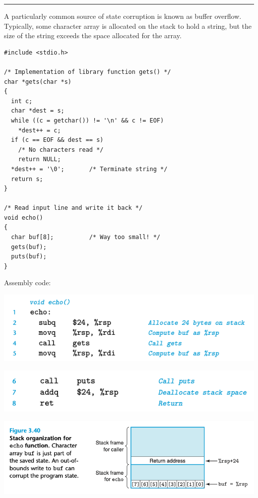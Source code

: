 \documentclass[11pt]{article}
\begin{document}
\noindent\rule{\textwidth}{0.5pt}
A particularly common source of state corruption is known as buffer overflow. Typically, some character array is allocated on the stack to hold a string, but the size of the string exceeds the space allocated for the array.\\

\begin{verbatim}
#include <stdio.h>

/* Implementation of library function gets() */
char *gets(char *s)
{
  int c;
  char *dest = s;
  while ((c = getchar()) != '\n' && c != EOF)
    *dest++ = c;
  if (c == EOF && dest == s)
    /* No characters read */
    return NULL;
  *dest++ = '\0';		/* Terminate string */
  return s;
}

/* Read input line and write it back */
void echo()
{
  char buf[8];			/* Way too small! */
  gets(buf);
  puts(buf);
}
\end{verbatim}

Assembly code:\\

\begin{center}
\includegraphics[width=.9\linewidth]{pics/echo-assembly-code-1.png}
\end{center}

\begin{center}
\includegraphics[width=.9\linewidth]{pics/echo-assembly-code-2.png}
\end{center}

\begin{center}
\includegraphics[width=.9\linewidth]{pics/stack-organization-for-echo-function.png}
\end{center}
\end{document}
